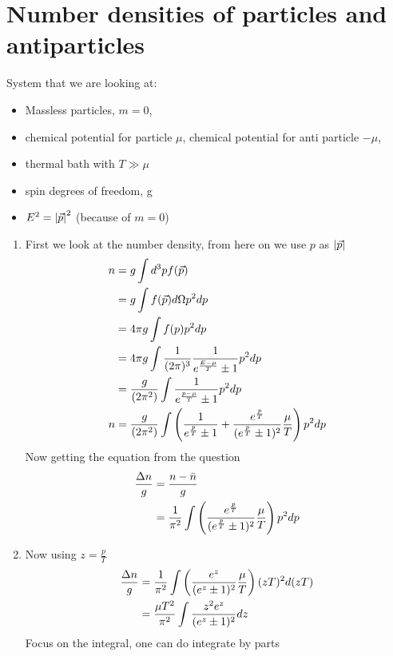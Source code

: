 \section{Number densities of particles and antiparticles}
System that we are looking at: 
\begin{itemize}
\item Massless particles, $m=0$,
\item chemical potential for particle $\mu$, chemical potential for anti particle $-\mu$,
\item thermal bath with $T \gg \mu$
\item spin degrees of freedom, g
\item $E^2 = \abs{\vec{p}}^2$ (because of $m=0$)
\end{itemize}
\begin{enumerate}[label=(\alph*)]
\item First we look at the number density, from here on we use $p$ as $\abs{\vec{p}}$ 
\begin{align}
n 	&= g \int d^{3} p f( \vec{p} ) \\ \notag 
	&= g \int 	f(\vec{p}) d\Omega p^2 dp \notag \\
	&= 4\pi g \int 	f(p) p^2 dp \notag  \\ 
	&= 4\pi g \int 	\frac{1}{(2\pi)^3} \frac{1}{e^{\frac{E-\mu}{T}}\pm 1}p^2 dp \notag  \\ 
	&= \frac{g}{(2\pi^2)} \int \frac{1}{e^{\frac{p-\mu}{T}}\pm 1}p^2 dp \notag \\ 
n 	&= \frac{g}{(2\pi^2)} \int \left( \frac{1}{e^{\frac{p}{T}}\pm 1} + \frac{e^{\frac{p}{T}}}{(e^{\frac{p}{T}}\pm 1)^2}\frac{\mu}{T}\right)p^2 dp  
\end{align}
Now getting the equation from the question
\begin{align}
\frac{\Delta n}{g} 	&= \frac{n-\bar{n}}{g} \\ \notag
				&= \frac{1}{\pi^2} \int \left( \frac{e^{\frac{p}{T}}}{(e^{\frac{p}{T}}\pm 1)^2}\frac{\mu}{T}\right)p^2 dp \notag
\end{align}
\item  Now using $z=\frac{p}{T}$
\begin{align}\label{eq:ng}
\frac{\Delta n}{g}	&= \frac{1}{\pi^2} \int \left( \frac{e^{z}}{(e^{z}\pm 1)^2} \frac{\mu}{T} \right)(zT)^2 d(zT) \notag \\ 
				&= \frac{\mu T^2}{\pi^2} \int \frac{z^2 e^{z}}{(e^{z} \pm 1)^2} dz 
\end{align}
Focus on the integral, one can do integrate by parts
\begin{align*}

\end{align*}
\end{enumerate}
